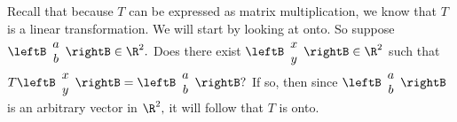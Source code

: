 \begin{solution} Recall that because $T$ can be expressed as matrix
multiplication, we know that $T$ is a linear transformation.  We will
start by looking at onto.  So suppose $\leftB
\begin{array}{c}
a \\
b
\end{array}
\rightB \in \R^{2}.$ Does there exist $\leftB
\begin{array}{c}
x \\
y
\end{array}
\rightB  \in \R^2 $ such that $T\leftB
\begin{array}{c}
x \\
y
\end{array}
\rightB =\leftB
\begin{array}{c}
a \\
b
\end{array}
\rightB ?$ If so, then since $\leftB
\begin{array}{c}
a \\
b
\end{array}
\rightB $ is an arbitrary vector in $\R^{2},$ it will follow that $T$
is onto. 


\end{solution}

